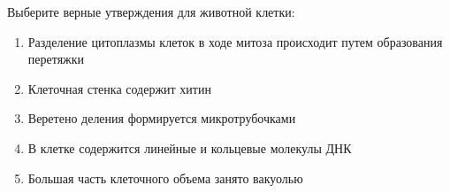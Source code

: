 
Выберите верные
утверждения для животной клетки:

\begin{enumerate}
    \item Разделение цитоплазмы клеток в ходе митоза происходит путем образования перетяжки
    \item Клеточная стенка содержит хитин
    \item Веретено деления формируется микротрубочками
    \item В клетке содержится линейные и кольцевые молекулы ДНК
    \item Большая часть клеточного объема занято вакуолью
\end{enumerate}

